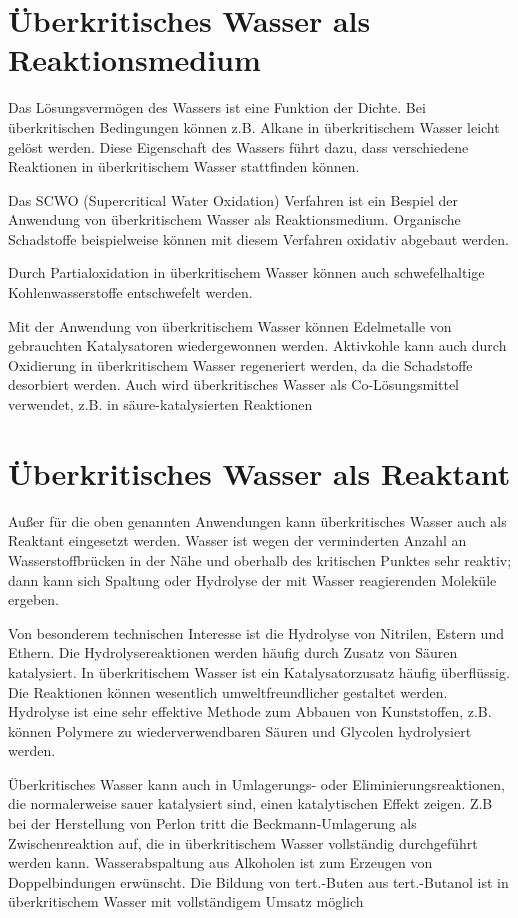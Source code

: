 \section{Überkritisches Wasser als Reaktionsmedium}
Das Lösungsvermögen des Wassers ist eine Funktion der Dichte. Bei überkritischen Bedingungen können z.B. Alkane in überkritischem Wasser leicht gelöst werden. Diese Eigenschaft des Wassers führt dazu, dass verschiedene Reaktionen in überkritischem Wasser stattfinden können.

Das SCWO (Supercritical Water Oxidation) Verfahren ist ein Bespiel der Anwendung von überkritischem Wasser als Reaktionsmedium. Organische Schadstoffe beispielweise können mit diesem Verfahren oxidativ abgebaut werden. 

Durch Partialoxidation in überkritischem Wasser können auch schwefelhaltige Kohlenwasserstoffe entschwefelt werden.  

Mit der Anwendung von überkritischem Wasser können Edelmetalle von gebrauchten Katalysatoren wiedergewonnen werden. Aktivkohle kann auch durch Oxidierung in überkritischem Wasser regeneriert werden, da die Schadstoffe desorbiert werden. Auch wird überkritisches Wasser als Co-Lösungsmittel verwendet, z.B. in säure-katalysierten Reaktionen

\section{Überkritisches Wasser als  Reaktant}
Außer für die oben genannten Anwendungen kann überkritisches Wasser auch als Reaktant eingesetzt werden. Wasser ist wegen der verminderten Anzahl  an Wasserstoffbrücken in der Nähe und oberhalb des kritischen Punktes sehr reaktiv; dann kann sich Spaltung oder Hydrolyse der  mit Wasser reagierenden Moleküle ergeben.
 
Von besonderem technischen Interesse ist die Hydrolyse von Nitrilen, Estern und Ethern. Die Hydrolysereaktionen werden häufig durch Zusatz von Säuren katalysiert. In überkritischem Wasser ist ein Katalysatorzusatz häufig überflüssig. Die Reaktionen können wesentlich umweltfreundlicher gestaltet werden. Hydrolyse ist eine sehr effektive Methode zum Abbauen von Kunststoffen, z.B. können Polymere zu wiederverwendbaren Säuren und Glycolen hydrolysiert werden.

Überkritisches Wasser kann auch  in  Umlagerungs- oder Eliminierungsreaktionen, die normalerweise sauer katalysiert sind,  einen katalytischen Effekt zeigen. Z.B bei der Herstellung von Perlon tritt die Beckmann-Umlagerung als Zwischenreaktion auf, die in überkritischem Wasser vollständig durchgeführt werden kann. Wasserabspaltung aus Alkoholen ist zum Erzeugen von  Doppelbindungen erwünscht. Die Bildung von tert.-Buten aus tert.-Butanol ist in überkritischem Wasser  mit vollständigem Umsatz möglich

